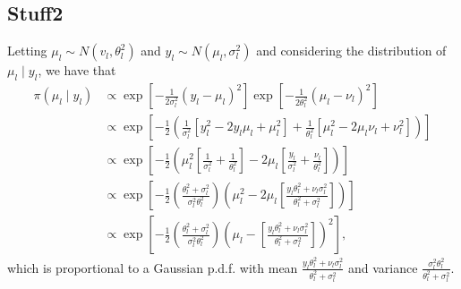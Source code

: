 \documentclass[a4paper]{article}
\begin{document}
\subsection{Stuff2}

Letting $\mu_l \sim N\left(v_l, \theta^2_l\right)$ and $y_l \sim N\left(\mu_l, \sigma^2_l\right)$ and considering the distribution of $\mu_l \mid y_l$, we have that
\begin{align}
    \pi\left(\mu_l \mid y_l\right) &\propto \exp\left[-\frac{1}{2\sigma^2_l}\left(y_l - \mu_l\right)^2\right]\exp\left[-\frac{1}{2\theta^2_l}\left(\mu_l - \nu_l\right)^2\right] \nonumber\\
    &\propto \exp\left[-\frac{1}{2}\left(\frac{1}{\sigma^2_l}\left[y^2_l - 2y_l\mu_l + \mu^2_l\right] + \frac{1}{\theta^2_l}\left[\mu^2_l - 2\mu_l\nu_l + \nu^2_l\right]\right)\right] \nonumber\\
    &\propto \exp\left[-\frac{1}{2}\left(\mu_l^2\left[\frac{1}{\sigma^2_l} + \frac{1}{\theta^2_l}\right] - 2\mu_l\left[\frac{y_l}{\sigma^2_l} + \frac{\nu_l}{\theta^2_l}\right]\right)\right]\nonumber\\
    &\propto \exp\left[-\frac{1}{2}\left(\frac{\theta^2_l + \sigma^2_l}{\sigma^2_l \theta^2_l}\right)\left(\mu_l^2 - 2\mu_l\left[\frac{y_l\theta^2_l + \nu_l\sigma^2_l}{\theta^2_l + \sigma^2_l}\right]\right)\right]\nonumber\\
    &\propto \exp\left[-\frac{1}{2}\left(\frac{\theta^2_l + \sigma^2_l}{\sigma^2_l \theta^2_l}\right)\left(\mu_l - \left[\frac{y_l\theta^2_l + \nu_l\sigma^2_l}{\theta^2_l + \sigma^2_l}\right]\right)^2\right],\label{eq:mugy}
\end{align}
which is proportional to a Gaussian p.d.f. with mean $\frac{y_l\theta^2_l + \nu_l\sigma^2_l}{\theta^2_l + \sigma^2_l}$ and variance $\frac{\sigma^2_l \theta^2_l}{\theta^2_l + \sigma^2_l}$.
\end{document}
